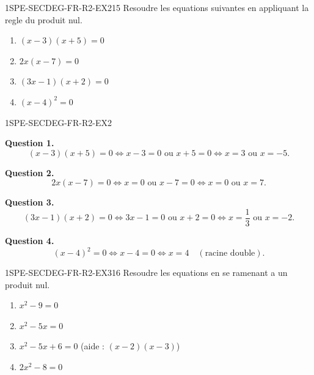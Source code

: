 
\begin{exercice}{1SPE-SECDEG-FR-R2-EX2}{1}{5}
Resoudre les equations suivantes en appliquant la regle du produit nul.
\begin{enumerate}
  \item $(x - 3)(x + 5) = 0$
  \item $2x(x - 7) = 0$
  \item $(3x - 1)(x + 2) = 0$
  \item $(x - 4)^2 = 0$
\end{enumerate}
\end{exercice}


\begin{corrige}{1SPE-SECDEG-FR-R2-EX2}


\textbf{Question 1.}
\[
(x-3)(x+5) = 0 \Leftrightarrow x - 3 = 0 \text{ ou } x + 5 = 0 \Leftrightarrow x = 3 \text{ ou } x = -5.
\]

\textbf{Question 2.}
\[
2x(x-7) = 0 \Leftrightarrow x = 0 \text{ ou } x - 7 = 0 \Leftrightarrow x = 0 \text{ ou } x = 7.
\]

\textbf{Question 3.}
\[
(3x-1)(x+2) = 0 \Leftrightarrow 3x - 1 = 0 \text{ ou } x + 2 = 0 \Leftrightarrow x = \frac{1}{3} \text{ ou } x = -2.
\]


\textbf{Question 4.}
\[
(x-4)^2 = 0 \Leftrightarrow x - 4 = 0 \Leftrightarrow x = 4 \quad (\text{racine double}).
\]

\end{corrige}


\begin{exercice}{1SPE-SECDEG-FR-R2-EX3}{1}{6}
Resoudre les equations en se ramenant a un produit nul.
\begin{enumerate}
  \item $x^2 - 9 = 0$
  \item $x^2 - 5x = 0$
  \item $x^2 - 5x + 6 = 0$ \quad (aide : $(x-2)(x-3)$)
  \item $2x^2 - 8 = 0$
\end{enumerate}
\end{exercice}

